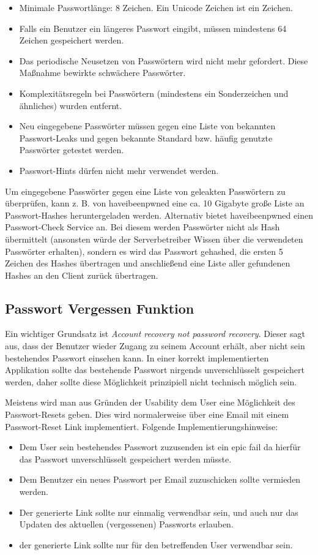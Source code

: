 \begin{itemize}
	\item Minimale Passwortlänge: 8 Zeichen. Ein Unicode Zeichen ist ein Zeichen.
	\item Falls ein Benutzer ein längeres Passwort eingibt, müssen mindestens 64 Zeichen gespeichert werden.
	\item Das periodische Neusetzen von Passwörtern wird nicht mehr gefordert. Diese Maßnahme bewirkte schwächere Passwörter.
	\item Komplexitätsregeln bei Passwörtern (mindestens ein Sonderzeichen und ähnliches) wurden entfernt.
	\item Neu eingegebene Passwörter müssen gegen eine Liste von bekannten Passwort-Leaks und gegen bekannte Standard bzw. häufig genutzte Passwörter getestet werden.
	\item Passwort-Hints dürfen nicht mehr verwendet werden.
\end{itemize}

Um eingegebene Passwörter gegen eine Liste von geleakten Passwörtern zu überprüfen, kann z. B. von haveibeenpwned eine ca. 10 Gigabyte große Liste an Passwort-Hashes heruntergeladen werden. Alternativ bietet haveibeenpwned einen Passwort-Check Service an. Bei diesem werden Passwörter nicht als Hash übermittelt (ansonsten würde der Serverbetreiber Wissen über die verwendeten Passwörter erhalten), sondern es wird das Passwort gehashed, die ersten 5 Zeichen des Hashes übertragen und anschließend eine Liste aller gefundenen Hashes an den Client zurück übertragen.

\subsection{Passwort Vergessen Funktion}

Ein wichtiger Grundsatz ist \textit{Account recovery not password recovery}. Dieser sagt aus, dass der Benutzer wieder Zugang zu seinem Account erhält, aber nicht sein bestehendes Passwort einsehen kann. In einer korrekt implementierten Applikation sollte das bestehende Passwort nirgends unverschlüsselt gespeichert werden, daher sollte diese Möglichkeit prinzipiell nicht technisch möglich sein.

Meistens wird man aus Gründen der Usability dem User eine Möglichkeit des Passwort-Resets geben. Dies wird normalerweise über eine Email mit einem Passwort-Reset Link implementiert. Folgende Implementierungshinweise:

\begin{itemize}
	\item Dem User sein bestehendes Passwort zuzusenden ist ein epic fail da hierfür das Passwort unverschlüsselt gespeichert werden müsste.
	\item Dem Benutzer ein neues Passwort per Email zuzuschicken sollte vermieden werden.
	\item Der generierte Link sollte nur einmalig verwendbar sein, und auch nur das Updaten des aktuellen (vergessenen) Passworts erlauben.
	\item der generierte Link sollte nur für den betreffenden User verwendbar sein.
\end{itemize}

